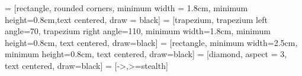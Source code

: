 \usepackage{tikz}       %
\usetikzlibrary{shapes.geometric, arrows}
 = [rectangle, rounded corners, minimum width = 1.8cm, minimum height=0.8cm,text centered, draw = black]
 = [trapezium, trapezium left angle=70, trapezium right angle=110, minimum width=1.8cm, minimum height=0.8cm, text centered, draw=black]
 = [rectangle, minimum width=2.5cm, minimum height=0.8cm, text centered, draw=black]
 = [diamond, aspect = 3, text centered, draw=black]
 = [->,>=stealth]
